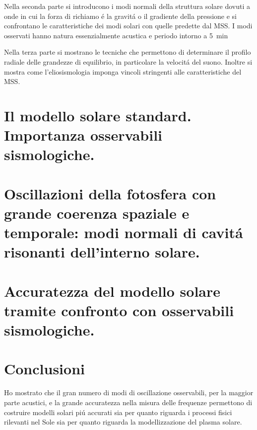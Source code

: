 \documentclass[twoside,11pt,fleqn]{memoir}%
\begin{document}
Nella seconda parte si introducono i modi normali della struttura solare dovuti a onde in cui la forza di richiamo \'e la gravit\'a o il gradiente della pressione e si confrontano le caratteristiche dei modi solari con quelle predette dal MSS. I modi osservati hanno natura essenzialmente acustica e periodo intorno a \SI{5}{\minute}

Nella terza parte si mostrano le tecniche che permettono di determinare il profilo radiale delle grandezze di equilibrio, in particolare la velocit\'a del suono. Inoltre si mostra come l'eliosismologia imponga vincoli stringenti alle caratteristiche del MSS.

{\let\clearpage\relax\let\cleardoublepage\relax
\part{Il modello solare standard. Importanza osservabili sismologiche.}
}



\cleartorecto
\part{Oscillazioni della fotosfera con grande coerenza spaziale e temporale: modi normali di cavit\'a risonanti dell'interno solare.}



\cleartorecto
\part{Accuratezza del modello solare tramite confronto con osservabili sismologiche.}



\cleartorecto
{\let\clearpage\relax\let\cleardoublepage\relax
\part{Conclusioni}
}

Ho mostrato che il gran numero di modi di oscillazione osservabili, per la maggior parte acustici, e la grande accuratezza nella misura delle frequenze permettono di costruire modelli solari pi\'u accurati sia per quanto riguarda i processi fisici rilevanti nel Sole sia per quanto riguarda la modellizzazione del plasma solare.
\end{document}
